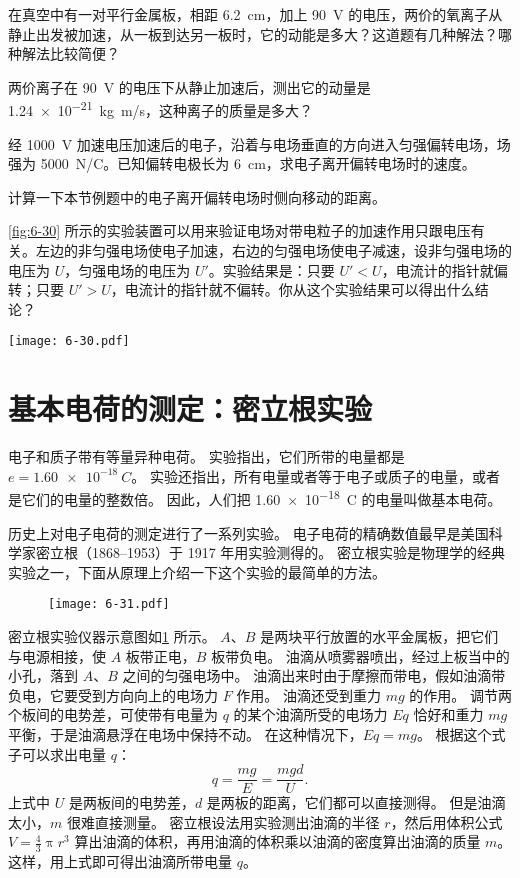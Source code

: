 \begin{Practice}
\begin{question}
	\item 在真空中有一对平行金属板，相距 \qty{6.2}{cm}，加上 \qty{90}{V} 的电压，两价的氧离子从静止出发被加速，从一板到达另一板时，它的动能是多大？这道题有几种解法？哪种解法比较简便？
	\item 两价离子在 \qty{90}{V} 的电压下从静止加速后，测出它的动量是 \qty{1.24e-21}{kg.m/s}，这种离子的质量是多大？
	\item 经 \qty{1000}{V} 加速电压加速后的电子，沿着与电场垂直的方向进入匀强偏转电场，场强为 \qty{5000}{N/C}。已知偏转电极长为 \qty{6}{cm}，求电子离开偏转电场时的速度。
	\item 计算一下本节例题中的电子离开偏转电场时侧向移动的距离。
	\item \cref{fig:6-30} 所示的实验装置可以用来验证电场对带电粒子的加速作用只跟电压有关。左边的非匀强电场使电子加速，右边的匀强电场使电子减速，设非匀强电场的电压为 $U$，匀强电场的电压为 $U'$。实验结果是：只要 $U'<U$，电流计的指针就偏转；只要 $U'>U$，电流计的指针就不偏转。你从这个实验结果可以得出什么结论？
	\begin{figurehere}
		\begin{minipage}{\linewidth}\centering
			\texttt{[image: 6-30.pdf]}
			\caption{}\label{fig:6-30}
		\end{minipage}
		\end{figurehere}
	\end{question}
\end{Practice}

\section{基本电荷的测定：密立根实验}

电子和质子带有等量异种电荷。
实验指出，它们所带的电量都是 $e=\qty{1.60e-18}{C}$。
实验还指出，所有电量或者等于电子或质子的电量，或者是它们的电量的整数倍。
因此，人们把 \qty{1.60e-18}{C} 的电量叫做基本电荷。

历史上对电子电荷的测定进行了一系列实验。
电子电荷的精确数值最早是美国科学家密立根（1868--1953）于 1917 年用实验测得的。
密立根实验是物理学的经典实验之一，下面从原理上介绍一下这个实验的最简单的方法。

\begin{figure}
	\texttt{[image: 6-31.pdf]}
	\caption{}\label{fig:6-31}
\end{figure}

密立根实验仪器示意图如\cref{fig:6-31} 所示。
$A$、$B$ 是两块平行放置的水平金属板，把它们与电源相接，使 $A$ 板带正电，$B$ 板带负电。
油滴从喷雾器喷出，经过上板当中的小孔，落到 $A$、$B$ 之间的匀强电场中。
油滴出来时由于摩擦而带电，假如油滴带负电，它要受到方向向上的电场力 $F$ 作用。
油滴还受到重力 $mg$ 的作用。
调节两个板间的电势差，可使带有电量为 $q$ 的某个油滴所受的电场力 $Eq$ 恰好和重力 $mg$ 平衡，于是油滴悬浮在电场中保持不动。
在这种情况下，$Eq=mg$。
根据这个式子可以求出电量 $q$：
\[q=\frac{mg}{E}=\frac{mgd}{U}.\]
上式中 $U$ 是两板间的电势差，$d$ 是两板的距离，它们都可以直接测得。
但是油滴太小，$m$ 很难直接测量。
密立根设法用实验测出油滴的半径 $r$，然后用体积公式 $V=\frac{4}{3}\uppi r^3$ 算出油滴的体积，再用油滴的体积乘以油滴的密度算出油滴的质量 $m$。
这样，用上式即可得出油滴所带电量 $q$。

